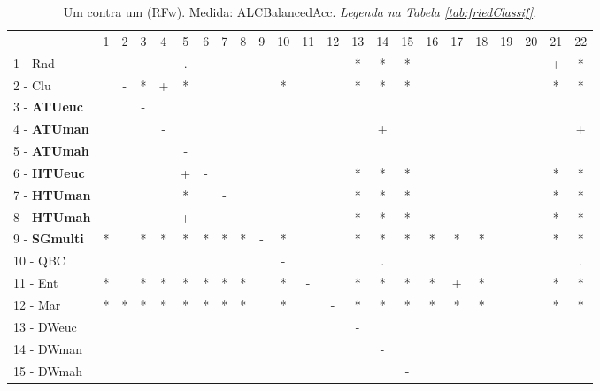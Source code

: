 \begin{table}[h]
\caption{Um contra um (RFw). Medida: ALCBalancedAcc. \textit{Legenda na Tabela \ref{tab:friedClassif}.}}
\begin{center}\begin{tabular}{lcc|cc|cc|cc|cc|cc|cc|cc|cc|cc|cc}
 			& 1 & 2 & 3 & 4 & 5 & 6 & 7 & 8 & 9 & 10 & 11 & 12 & 13 & 14 & 15 & 16 & 17 & 18 & 19 & 20 & 21 & 22\\
1 - Rnd  	& - &   &   &   & . &   &   &   &   &   &   &   & * & * & * &   &   &   &   &   & + & * \\
2 - Clu  	&   & - & * & + & * &   &   &   &   & * &   &   & * & * & * &   &   &   &   &   & * & * \\ \hline
3 - \textbf{ATUeuc}	&   &   & - &   &   &   &   &   &   &   &   &   &   &   &   &   &   &   &   &   &   &   \\
4 - \textbf{ATUman}	&   &   &   & - &   &   &   &   &   &   &   &   &   & + &   &   &   &   &   &   &   & + \\ \hline
5 - \textbf{ATUmah}	&   &   &   &   & - &   &   &   &   &   &   &   &   &   &   &   &   &   &   &   &   &   \\
6 - \textbf{HTUeuc}	&   &   &   &   & + & - &   &   &   &   &   &   & * & * & * &   &   &   &   &   & * & * \\ \hline
7 - \textbf{HTUman}	&   &   &   &   & * &   & - &   &   &   &   &   & * & * & * &   &   &   &   &   & * & * \\
8 - \textbf{HTUmah}	&   &   &   &   & + &   &   & - &   &   &   &   & * & * & * &   &   &   &   &   & * & * \\ \hline
9 - \textbf{SGmulti}	& * &   & * & * & * & * & * & * & - & * &   &   & * & * & * & * & * & * &   &   & * & * \\
10 - QBC  	&   &   &   &   &   &   &   &   &   & - &   &   &   & . &   &   &   &   &   &   &   & . \\ \hline
11 - Ent  	& * &   & * & * & * & * & * & * &   & * & - &   & * & * & * & * & + & * &   &   & * & * \\
12 - Mar  	& * & * & * & * & * & * & * & * &   & * &   & - & * & * & * & * & * & * &   &   & * & * \\ \hline
13 - DWeuc	&   &   &   &   &   &   &   &   &   &   &   &   & - &   &   &   &   &   &   &   &   &   \\
14 - DWman	&   &   &   &   &   &   &   &   &   &   &   &   &   & - &   &   &   &   &   &   &   &   \\ \hline
15 - DWmah	&   &   &   &   &   &   &   &   &   &   &   &   &   &   & - &   &   &   &   &   &   &   \\

\end{tabular}
\end{center}
\end{table}
